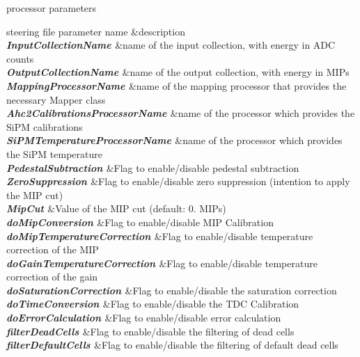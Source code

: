 \begin{DoxyParagraph}{processor parameters}
\begin{TabularC}{2}
\hline
steering file parameter name &description  \\
{\bfseries {\itshape  Input\-Collection\-Name }}&name of the input collection, with energy in A\-D\-C counts \\
{\bfseries {\itshape  Output\-Collection\-Name }}&name of the output collection, with energy in M\-I\-Ps \\
{\bfseries {\itshape  Mapping\-Processor\-Name }}&name of the mapping processor that provides the necessary Mapper class \\
{\bfseries {\itshape  Ahc2\-Calibrations\-Processor\-Name }}&name of the processor which provides the Si\-P\-M calibrations \\
{\bfseries {\itshape  Si\-P\-M\-Temperature\-Processor\-Name }}&name of the processor which provides the Si\-P\-M temperature \\
{\bfseries {\itshape  Pedestal\-Subtraction }}&Flag to enable/disable pedestal subtraction \\
{\bfseries {\itshape  Zero\-Suppression }}&Flag to enable/disable zero suppression (intention to apply the M\-I\-P cut) \\
{\bfseries {\itshape  Mip\-Cut }}&Value of the M\-I\-P cut (default\-: 0. M\-I\-Ps) \\
{\bfseries {\itshape  do\-Mip\-Conversion }}&Flag to enable/disable M\-I\-P Calibration \\
{\bfseries {\itshape  do\-Mip\-Temperature\-Correction }}&Flag to enable/disable temperature correction of the M\-I\-P \\
{\bfseries {\itshape  do\-Gain\-Temperature\-Correction }}&Flag to enable/disable temperature correction of the gain \\
{\bfseries {\itshape  do\-Saturation\-Correction }}&Flag to enable/disable the saturation correction \\
{\bfseries {\itshape  do\-Time\-Conversion }}&Flag to enable/disable the T\-D\-C Calibration \\
{\bfseries {\itshape  do\-Error\-Calculation }}&Flag to enable/disable error calculation \\
{\bfseries {\itshape  filter\-Dead\-Cells }}&Flag to enable/disable the filtering of dead cells \\
{\bfseries {\itshape  filter\-Default\-Cells }}&Flag to enable/disable the filtering of default dead cells \\
\end{TabularC}

\end{DoxyParagraph}
